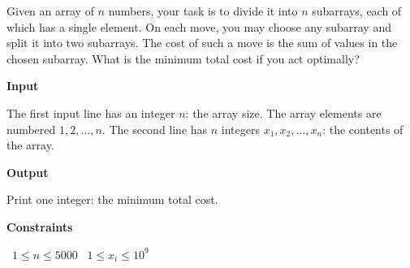 Given an array of $n$ numbers, your task is to divide it into $n$ subarrays, each of which has a single element.
On each move, you may choose any subarray and split it into two subarrays. The cost of such a move is the sum of values in the chosen subarray.
What is the minimum total cost if you act optimally?

\vspace{0.3cm}\noindent\textbf{Input}

The first input line has an integer $n$: the array size. The array elements are numbered $1,2,\dots,n$.
The second line has $n$ integers $x_1,x_2,\dots,x_n$: the contents of the array.

\vspace{0.3cm}\noindent\textbf{Output}

Print one integer: the minimum total cost.

\vspace{0.3cm}\noindent\textbf{Constraints}

\textbullet\ $1 \le n \le 5000$
\textbullet\ $1 \le x_i \le 10^9$